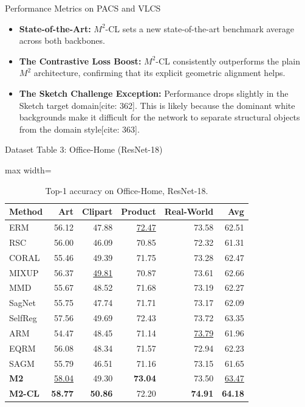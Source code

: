 \documentclass[t, aspectratio=169]{beamer} %
\begin{document}
	\begin{frame}{Performance Metrics on PACS and VLCS}
			\begin{itemize}
				\item \textbf{State-of-the-Art:} $M^2$-CL sets a new state-of-the-art benchmark average across both backbones.
				\item \textbf{The Contrastive Loss Boost:} $M^2$-CL consistently outperforms the plain $M^2$ architecture, confirming that its explicit geometric alignment helps.
				\item \textbf{The Sketch Challenge Exception:} Performance drops slightly in the Sketch target domain[cite: 362]. This is likely because the dominant white backgrounds make it difficult for the network to separate structural objects from the domain style[cite: 363].
			\end{itemize}
	\end{frame}

	\begin{frame}{Dataset Table 3: Office-Home (ResNet-18)}
\begin{table}[htbp]
\centering
\caption{Top-1 accuracy on Office-Home, ResNet-18.}
\scriptsize
\begin{adjustbox}{max width=\textwidth}
\begin{tabular}{lrrrrr}
\toprule
Method & Art & Clipart & Product & Real-World & Avg \\
\midrule
ERM & 56.12 & 47.88 & \underline{72.47} & 73.58 & 62.51 \\
RSC & 56.00 & 46.09 & 70.85 & 72.32 & 61.31 \\
CORAL & 55.46 & 49.39 & 71.75 & 73.28 & 62.47 \\
MIXUP & 56.37 & \underline{49.81} & 70.87 & 73.61 & 62.66 \\
MMD & 55.67 & 48.52 & 71.68 & 73.19 & 62.27 \\
SagNet & 55.75 & 47.74 & 71.71 & 73.17 & 62.09 \\
SelfReg & 57.56 & 49.69 & 72.43 & 73.72 & 63.35 \\
ARM & 54.47 & 48.45 & 71.14 & \underline{73.79} & 61.96 \\
EQRM & 56.08 & 48.34 & 71.57 & 72.94 & 62.23 \\
SAGM & 55.79 & 46.51 & 71.16 & 73.15 & 61.65 \\
\midrule
\textbf{M2} & \underline{58.04} & 49.30 & \textbf{73.04} & 73.50 & \underline{63.47} \\
\textbf{M2-CL} & \textbf{58.77} & \textbf{50.86} & 72.20 & \textbf{74.91} & \textbf{64.18} \\
\bottomrule
\end{tabular}
\end{adjustbox}
\end{table}
	\end{frame}
\end{document}
